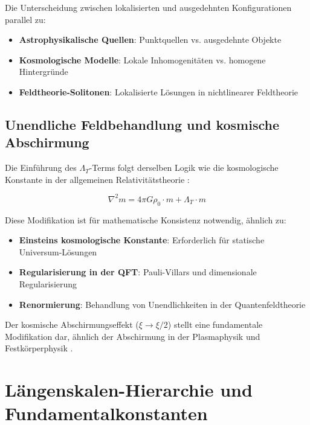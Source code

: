 \documentclass[12pt,a4paper]{article}
\begin{document}
	Die Unterscheidung zwischen lokalisierten und ausgedehnten Konfigurationen parallel zu:
	\begin{itemize}
		\item \textbf{Astrophysikalische Quellen}: Punktquellen vs. ausgedehnte Objekte \citep{binney2008,carroll2006}
		\item \textbf{Kosmologische Modelle}: Lokale Inhomogenitäten vs. homogene Hintergründe \citep{weinberg2008,peebles1993}
		\item \textbf{Feldtheorie-Solitonen}: Lokalisierte Lösungen in nichtlinearer Feldtheorie \citep{rajaraman1982}
	\end{itemize}
	
	\subsection{Unendliche Feldbehandlung und kosmische Abschirmung}
	\label{subsec:infinite_field_treatment}
	
	Die Einführung des $\Lambda_T$-Terms folgt derselben Logik wie die kosmologische Konstante in der allgemeinen Relativitätstheorie \citep{einstein1917,weinberg1989}:
	
	\begin{equation}
		\nabla^2 m = 4\pi G \rho_0 \cdot m + \Lambda_T \cdot m
	\end{equation}
	
	Diese Modifikation ist für mathematische Konsistenz notwendig, ähnlich zu:
	\begin{itemize}
		\item \textbf{Einsteins kosmologische Konstante}: Erforderlich für statische Universum-Lösungen \citep{einstein1917}
		\item \textbf{Regularisierung in der QFT}: Pauli-Villars und dimensionale Regularisierung \citep{peskin1995}
		\item \textbf{Renormierung}: Behandlung von Unendlichkeiten in der Quantenfeldtheorie \citep{collins1984}
	\end{itemize}
	
	Der kosmische Abschirmungseffekt ($\xi \to \xi/2$) stellt eine fundamentale Modifikation dar, ähnlich der Abschirmung in der Plasmaphysik \citep{chen1984} und Festkörperphysik \citep{ashcroft1976}.
	
	\section{Längenskalen-Hierarchie und Fundamentalkonstanten}
	\label{sec:length_scales}
	
\end{document}
